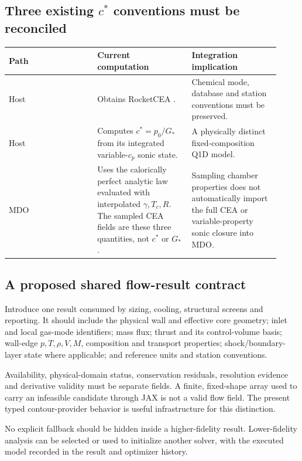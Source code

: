 \subsection{Three existing \(c^*\) conventions must be reconciled}
\begin{longtable}{@{}P{0.30\linewidth}P{0.32\linewidth}P{0.30\linewidth}@{}}
\toprule\textbf{Path} & \textbf{Current computation} & \textbf{Integration implication}\\\midrule
\endhead
Host  &
Obtains RocketCEA . &
Chemical mode, database and station conventions must be preserved.\\
Host  &
Computes \(c^*=p_0/G_*\) from its integrated variable-\(c_p\) sonic state. &
A physically distinct fixed-composition Q1D model.\\
MDO  &
Uses the calorically perfect analytic law evaluated with interpolated
\(\gamma,T_c,R\). The sampled CEA fields are these three quantities,
not \(c^*\) or \(G_*\). &
Sampling chamber properties does not automatically import the full
CEA or variable-property sonic closure into MDO.\\
\bottomrule
\end{longtable}

\subsection{A proposed shared flow-result contract}
\proposal Introduce one result consumed by sizing, cooling, structural
screens and reporting. It should include the physical wall and effective
core geometry; inlet and local gas-mode identifiers; mass flux; thrust and
its control-volume basis; wall-edge \(p,T,\rho,V,M\), composition and
transport properties; shock/boundary-layer state where applicable; and
reference units and station conventions.

Availability, physical-domain status, conservation residuals, resolution
evidence and derivative validity must be separate fields. A finite,
fixed-shape array used to carry an infeasible candidate through JAX is
not a valid flow field. The present typed contour-provider behavior is
useful infrastructure for this distinction.

No explicit fallback should be hidden inside a higher-fidelity result.
Lower-fidelity analysis can be selected or used to initialize another
solver, with the executed model recorded in the result and optimizer
history.
